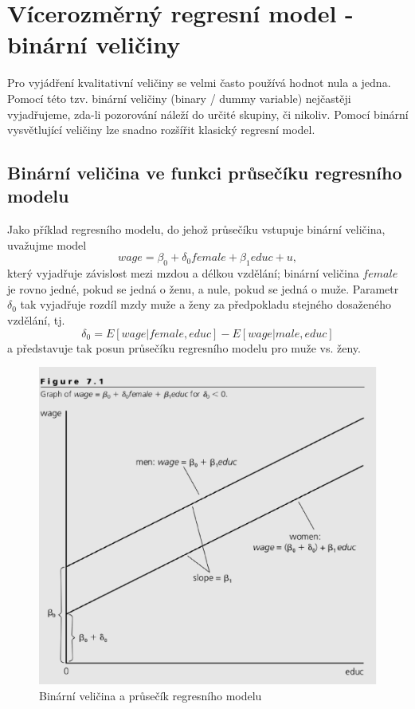 \chapter[Vícerozměrný regresní model \\ Binární veličiny]{Vícerozměrný regresní model - binární veličiny}

Pro vyjádření kvalitativní veličiny se velmi často používá 
hodnot nula a jedna. Pomocí této tzv. binární veličiny (binary / dummy variable)
nejčastěji vyjadřujeme, zda-li pozorování náleží do určité 
skupiny, či nikoliv. Pomocí binární vysvětlující veličiny lze 
snadno rozšířit klasický regresní model.

\section{Binární veličina ve funkci průsečíku regresního modelu}

Jako příklad regresního modelu, do jehož průsečíku vstupuje 
binární veličina, uvažujme model
\begin{equation}
wage = \beta_0 + \delta_0 female + \beta_1 educ + u,
\end{equation}
který vyjadřuje závislost mezi mzdou a délkou vzdělání; 
binární veličina $female$ je rovno jedné, pokud se jedná o ženu, 
a nule, pokud se jedná o muže. Parametr $\delta_0$ tak vyjadřuje 
rozdíl mzdy muže a ženy za předpokladu stejného dosaženého 
vzdělání, tj.
\begin{equation}
\delta_0 = E[wage|female,educ] - E[wage|male, educ]
\end{equation}
a představuje tak posun průsečíku regresního modelu pro muže vs. ženy.

\begin{figure}[htp]
\centering
\includegraphics[scale = 0.5]{pictures/figure_7_1.eps}
\caption{Binární veličina a průsečík regresního modelu}
\label{figure_7_1}
\end{figure} 

